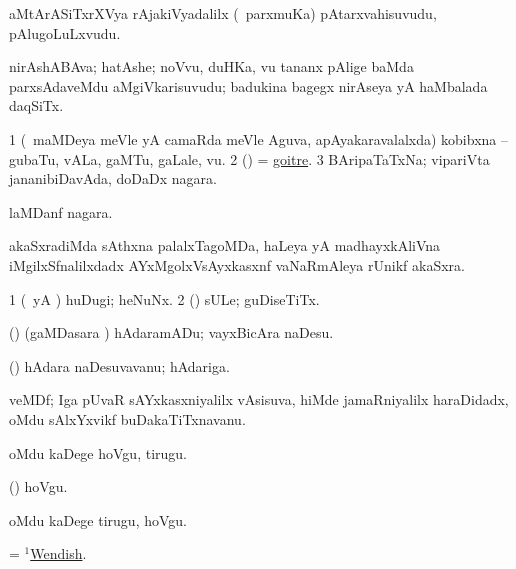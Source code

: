 \bentry
{} 
\gl{\nA}
\expl{\G}
\bmng
aMtArASiTxrXVya rAjakiVyadalilx (\kanmu\ parxmuKa) pAtarxvahisuvudu, pAlugoLuLxvudu. 
\emng
\eentry

\bentry 
{} 
\gl{\nA}
\expl{\G}
\bmng
nirAshABAva; hatAshe; noVvu, duHKa, \mo vu tananx pAlige baMda parxsAdaveMdu aMgiVkarisuvudu; badukina bagegx nirAseya yA haMbalada daqSiTx. 
\emng
\eentry

\bentry
{} 
\gl{\nA}
\expl{}
\bmng
\bnum
\num{1} (\kanmu\ maMDeya meVle yA camaRda meVle Aguva, apAyakaravalalxda) kobibxna -- gubaTu, vALa, gaMTu, gaLale, \mo vu. 
\num{2} (\pArxparx) = \hyperref{kandict_g.pdf}{G}{goitre}{goitre}. 
\num{3} BAripaTaTxNa; vipariVta jananibiDavAda, doDaDx nagara. 
\enum
\emng

\noindent 
\gl{\pagu}
\expl{}
\bmng
{} laMDanf nagara. 
\emng
\eentry

\bentry
{} 
\gl{\nA}
\expl{}
\bmng
{} akaSxradiMda sAthxna palalxTagoMDa, haLeya yA madhayxkAliVna iMgilxSfnalilxdadx AYxMgolxVsAyxkasxnf vaNaRmAleya rUnikf akaSxra. 
\emng
\eentry

\bentry
{} 
\gl{\nA}
\expl{}
\bmng
\bnum
\num{1} (\AmA\ yA \hA) huDugi; heNuNx. 
\num{2} (\pArxparx) sULe; guDiseTiTx. 
\enum
\emng
\eentry

\bentry
{} 
\gl{\akirx}
\expl{}
\bmng
(\pArxparx) (gaMDasara \vi) hAdaramADu; vayxBicAra naDesu. 
\emng
\eentry

\bentry
{} 
\gl{\nA}
\expl{}
\bmng
(\pArxparx) hAdara naDesuvavanu; hAdariga. 
\emng
\eentry

\bentry
{} 
\gl{\nA}
\expl{}
\bmng
veMDf; Iga pUvaR sAYxkasxniyalilx vAsisuva, hiMde \kanu jamaRniyalilx haraDidadx, oMdu sAlxYxvikf buDakaTiTxnavanu. 
\emng
\eentry

\bentry
{} 
\gl{\sakirx}
\expl{}
\bmng
oMdu kaDege hoVgu, tirugu. 
\emng

\noindent 
\gl{\akirx}
\expl{}
\bmng
(\pArxparx) hoVgu. 
\emng

\noindent 
\gl{\pagu}
\expl{}
\bmng
{} oMdu kaDege tirugu, hoVgu. 
\emng
\eentry

\bentry
{} 
\gl{\gu}
\expl{}
\bmng
= \hyperlink{Wendish(1)}{$^1$Wendish}. 
\emng
\eentry

